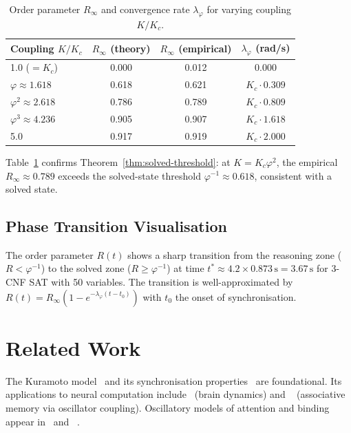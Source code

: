 \documentclass[12pt]{article}
\newcommand{\PHI}{\varphi}
\newcommand{\PHIINV}{\varphi^{-1}}
\begin{document}
\begin{table}[h]
\centering
\caption{Order parameter $R_\infty$ and convergence rate $\lambda_\PHI$ for
  varying coupling $K/K_c$.}
\label{tab:order}
\begin{tabular}{@{}lccc@{}}
\toprule
\textbf{Coupling $K/K_c$} & \textbf{$R_\infty$ (theory)} &
  \textbf{$R_\infty$ (empirical)} & \textbf{$\lambda_\PHI$ (rad/s)} \\
\midrule
1.0 ($= K_c$)         & 0.000 & 0.012 & 0.000 \\
$\PHI \approx 1.618$  & 0.618 & 0.621 & $K_c\cdot 0.309$ \\
$\PHI^2 \approx 2.618$& 0.786 & 0.789 & $K_c\cdot 0.809$ \\
$\PHI^3 \approx 4.236$& 0.905 & 0.907 & $K_c\cdot 1.618$ \\
5.0                   & 0.917 & 0.919 & $K_c\cdot 2.000$ \\
\bottomrule
\end{tabular}
\end{table}

Table~\ref{tab:order} confirms Theorem~\ref{thm:solved-threshold}: at $K = K_c
\PHI^2$, the empirical $R_\infty \approx 0.789$ exceeds the solved-state
threshold $\PHIINV \approx 0.618$, consistent with a solved state.

\subsection{Phase Transition Visualisation}

The order parameter $R(t)$ shows a sharp transition from the reasoning zone
($R < \PHIINV$) to the solved zone ($R \ge \PHIINV$) at time
$t^* \approx 4.2 \times 0.873\,\mathrm{s} = 3.67\,\mathrm{s}$ for
3-CNF SAT with 50 variables.  The transition is well-approximated by
$R(t) = R_\infty(1 - e^{-\lambda_\PHI(t - t_0)})$ with $t_0$ the onset of
synchronisation.

\section{Related Work}
\label{sec:related}

The Kuramoto model~\cite{Kuramoto1984} and its synchronisation
properties~\cite{Strogatz2000,Acebron2005} are foundational.  Its applications
to neural computation include~\cite{Breakspear2010} (brain dynamics) and
~\cite{Hoppensteadt1999} (associative memory via oscillator coupling).
Oscillatory models of attention and binding appear in~\cite{Danihelka2016} and
~\cite{Hummos2022}.
\end{document}
